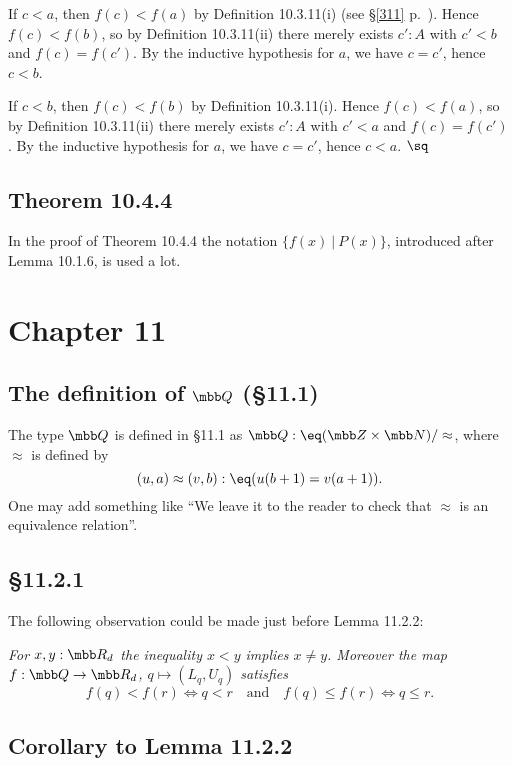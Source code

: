 \documentclass[12pt]{article}
\begin{document}
If $c<a$, then $f(c)<f(a)$ by Definition 10.3.11(i) (see \S\ref{311} p.~\pageref{311}). Hence $f(c)<f(b)$, so by Definition 10.3.11(ii) there merely exists $c':A$ with $c'<b$ and $f(c)=f(c')$. By the inductive hypothesis for $a$, we have $c=c'$, hence $c<b$. 

If $c<b$, then $f(c)<f(b)$ by Definition 10.3.11(i). Hence $f(c)<f(a)$, so by Definition 10.3.11(ii) there merely exists $c':A$ with $c'<a$ and $f(c)=f(c')$. By the inductive hypothesis for $a$, we have $c=c'$, hence $c<a$. $\sq$


\subsection{Theorem 10.4.4}

In the proof of Theorem 10.4.4 the notation $\{f(x)\ \vert\ P(x)\}$, introduced after Lemma 10.1.6, is used a lot.


\section{Chapter 11}

\subsection[The definition of \tb Q (\S11.1)]{The definition of $\mbb Q$ (\S11.1)}

The type $\mbb Q$ is defined in \S11.1 as $\mbb Q:\eq(\mbb Z\times\mbb N)/\approx$, where $\approx$ is defined by 
$$
(u,a)\approx(v,b):\eq(u(b+1)=v(a+1)).
$$ 
One may add something like ``We leave it to the reader to check that $\approx$ is an equivalence relation''.


\subsection{\S11.2.1}

The following observation could be made just before Lemma 11.2.2: 

\nn\emph{For $x,y:\mbb R_d$ the inequality $x<y$ implies $x\neq y$. Moreover the map $f:\mbb Q\to\mbb R_d$, $q\mapsto(L_q,U_q)$ satisfies}
$$
f(q)<f(r)\iff q<r\quad\text{and}\quad f(q)\le f(r)\iff q\le r.
$$ 


\subsection{Corollary to Lemma 11.2.2}\label{1122}
\end{document}
